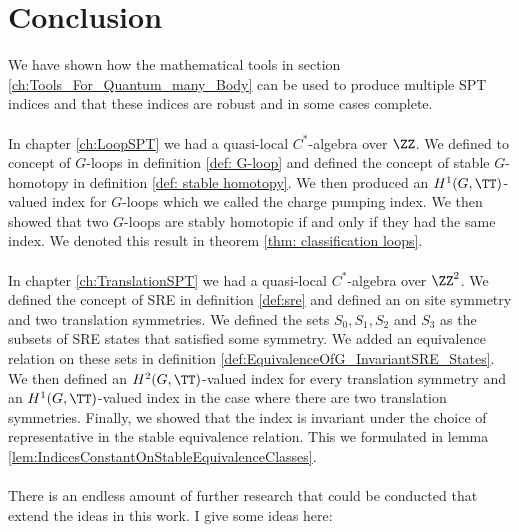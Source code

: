 \chapter{Conclusion}\label{ch:conclusion}

We have shown how the mathematical tools in section \ref{ch:Tools_For_Quantum_many_Body} can be used to produce multiple SPT indices and that these indices are robust and in some cases complete.
\\\\
In chapter \ref{ch:LoopSPT} we had a quasi-local $C^*$-algebra over $\ZZ$. We defined to concept of $G$-loops in definition \ref{def: G-loop} and defined the concept of stable $G$-homotopy in definition \ref{def: stable homotopy}. We then produced an $H^1(G,\TT)$-valued index for $G$-loops which we called the charge pumping index. We then showed that two $G$-loops are stably homotopic if and only if they had the same index. We denoted this result in theorem \ref{thm: classification loops}.
\\\\
In chapter \ref{ch:TranslationSPT} we had a quasi-local $C^*$-algebra over $\ZZ^2$. We defined the concept of SRE in definition \ref{def:sre} and defined an on site symmetry and two translation symmetries. We defined the sets $S_0,S_1,S_2$ and $S_3$ as the subsets of SRE states that satisfied some symmetry. We added an equivalence relation on these sets in definition \ref{def:EquivalenceOfG_InvariantSRE_States}. We then defined an $H^2(G,\TT)$-valued index for every translation symmetry and an $H^1(G,\TT)$-valued index in the case where there are two translation symmetries. Finally, we showed that the index is invariant under the choice of representative in the stable equivalence relation. This we formulated in lemma \ref{lem:IndicesConstantOnStableEquivalenceClasses}.
\\\\
There is an endless amount of further research that could be conducted that extend the ideas in this work. I give some ideas here:
